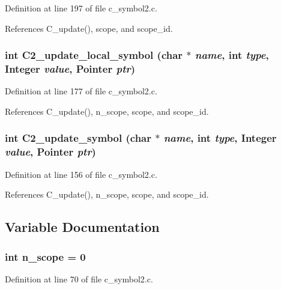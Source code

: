Definition at line 197 of file c\_\-symbol2.c.

References C\_\-update(), scope, and scope\_\-id.
\subsubsection{\setlength{\rightskip}{0pt plus 5cm}int C2\_\-update\_\-local\_\-symbol (char $\ast$ {\em name}, int {\em type}, \bf{Integer} {\em value}, \bf{Pointer} {\em ptr})}\label{c__symbol2_8c_92a8b119b6aa8a5ae4e2edb16b529345}




Definition at line 177 of file c\_\-symbol2.c.

References C\_\-update(), n\_\-scope, scope, and scope\_\-id.
\subsubsection{\setlength{\rightskip}{0pt plus 5cm}int C2\_\-update\_\-symbol (char $\ast$ {\em name}, int {\em type}, \bf{Integer} {\em value}, \bf{Pointer} {\em ptr})}\label{c__symbol2_8c_880d798e681989217dcd06cf2c6b1401}




Definition at line 156 of file c\_\-symbol2.c.

References C\_\-update(), n\_\-scope, scope, and scope\_\-id.

\subsection{Variable Documentation}
\subsubsection{\setlength{\rightskip}{0pt plus 5cm}int \bf{n\_\-scope} = 0\hspace{0.3cm}{\tt  [static]}}\label{c__symbol2_8c_bbcd1bb3b265ee18b7a7c8c14b7f6bff}




Definition at line 70 of file c\_\-symbol2.c.

